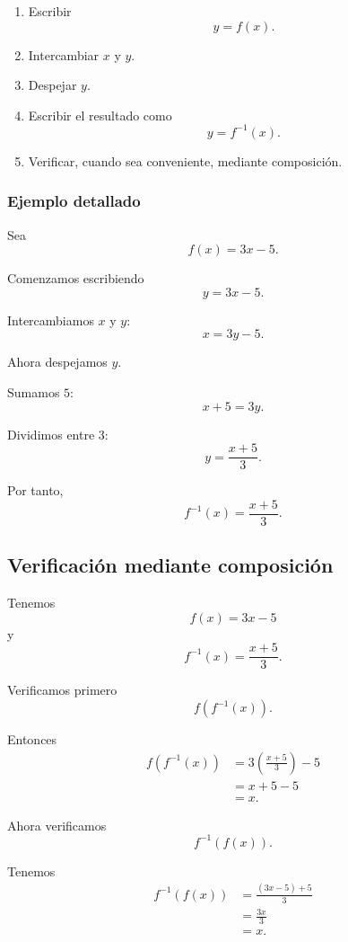 \documentclass[12pt]{article}
\theoremstyle{remark}
\begin{document}
\begin{enumerate}
    \item Escribir
    \[
    y=f(x).
    \]

    \item Intercambiar \(x\) y \(y\).

    \item Despejar \(y\).

    \item Escribir el resultado como
    \[
    y=f^{-1}(x).
    \]

    \item Verificar, cuando sea conveniente, mediante composición.
\end{enumerate}

\subsubsection{Ejemplo detallado}

Sea
\[
f(x)=3x-5.
\]

Comenzamos escribiendo
\[
y=3x-5.
\]

Intercambiamos \(x\) y \(y\):
\[
x=3y-5.
\]

Ahora despejamos \(y\).

Sumamos \(5\):
\[
x+5=3y.
\]

Dividimos entre \(3\):
\[
y=\frac{x+5}{3}.
\]

Por tanto,
\[
\boxed{
f^{-1}(x)=\frac{x+5}{3}.
}
\]

\subsection{Verificación mediante composición}

Tenemos
\[
f(x)=3x-5
\]
y
\[
f^{-1}(x)=\frac{x+5}{3}.
\]

Verificamos primero
\[
f(f^{-1}(x)).
\]

Entonces
\[
\begin{aligned}
f(f^{-1}(x))
&=
3\left(\frac{x+5}{3}\right)-5
\\
&=
x+5-5
\\
&=
x.
\end{aligned}
\]

Ahora verificamos
\[
f^{-1}(f(x)).
\]

Tenemos
\[
\begin{aligned}
f^{-1}(f(x))
&=
\frac{(3x-5)+5}{3}
\\
&=
\frac{3x}{3}
\\
&=
x.
\end{aligned}
\]
\end{document}
